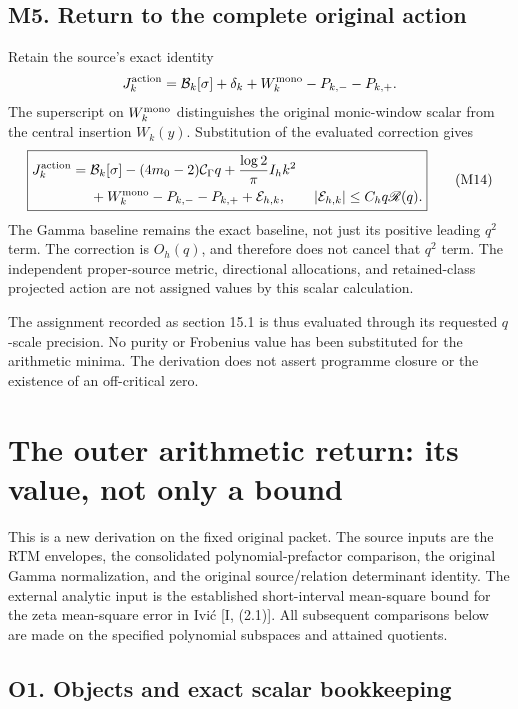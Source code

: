 \documentclass[
  11pt,
]{article}
\begin{document}
\subsection{M5. Return to the complete original
action}\label{m5.-return-to-the-complete-original-action}

Retain the source's exact identity \[
J_k^{\rm action}=\mathcal B_k[\sigma]+\delta_k
+W_k^{\rm mono}-P_{k,-}-P_{k,+}.
\] The superscript on \(W_k^{\rm mono}\) distinguishes the original
monic-window scalar from the central insertion \(W_k(y)\). Substitution
of the evaluated correction gives \[
\boxed{\begin{aligned}
J_k^{\rm action}={}&\mathcal B_k[\sigma]
-(4m_0-2)\mathcal C_\Gamma q
+\frac{\log2}{\pi}I_hk^2\\
&+W_k^{\rm mono}-P_{k,-}-P_{k,+}
+\mathcal E_{h,k},
\qquad |\mathcal E_{h,k}|\le C_hq\mathscr R(q).
\end{aligned}}\tag{M14}
\] The Gamma baseline remains the exact baseline, not just its positive
leading \(q^2\) term. The correction is \(O_h(q)\), and therefore does
not cancel that \(q^2\) term. The independent proper-source metric,
directional allocations, and retained-class projected action are not
assigned values by this scalar calculation.

The assignment recorded as section 15.1 is thus evaluated through its
requested \(q\)-scale precision. No purity or Frobenius value has been
substituted for the arithmetic minima. The derivation does not assert
programme closure or the existence of an off-critical zero.

\newpage

\section{The outer arithmetic return: its value, not only a
bound}\label{the-outer-arithmetic-return-its-value-not-only-a-bound}

This is a new derivation on the fixed original packet. The source inputs
are the RTM envelopes, the consolidated polynomial-prefactor comparison,
the original Gamma normalization, and the original source/relation
determinant identity. The external analytic input is the established
short-interval mean-square bound for the zeta mean-square error in Ivić
{[}I, (2.1){]}. All subsequent comparisons below are made on the
specified polynomial subspaces and attained quotients.

\subsection{O1. Objects and exact scalar
bookkeeping}\label{o1.-objects-and-exact-scalar-bookkeeping}
\end{document}
